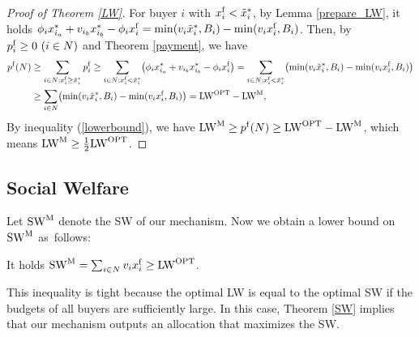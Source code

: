\documentclass[letterpaper,11pt]{article}
\begin{document}
\begin{proof}[Proof of Theorem \ref{LW}]
	For buyer $i$ with $x^{\rm f}_i< \tilde{x}^*_i$, by Lemma \ref{prepare_LW}, 
	it holds $\phi_{i}x_{i_{a}}^*+v_{i_{b}}x_{i_{b}}^*-\phi_{i}x^{\rm f}_{i}= \min(v_i \tilde{x}^{*}_i, B_i)-\min(v_i x^{\rm f}_i, B_i)$.
	Then, by $p^{\rm f}_i\geq 0\ (i\in N)$ and Theorem \ref{payment}, we have
	\begin{align*}
	p^{\rm f}(N) &\geq \sum_{i\in N; x^{\rm f}_i\geq \tilde{x}^*_i}p^{\rm f}_i\geq \sum_{i\in N; x^{\rm f}_i< \tilde{x}^*_i}\bigl(\phi_{i}x_{i_{a}}^*+v_{i_{b}}x_{i_{b}}^*-\phi_{i}x^{\rm f}_{i}\bigr)= \sum_{i\in N; x^{\rm f}_i< \tilde{x}^*_i}\bigl(\min(v_i \tilde{x}^{*}_i, B_i)-\min(v_i x^{\rm f}_i, B_i)\bigr)\\
	&\geq  \sum_{i\in N}\bigl(\min(v_i \tilde{x}^{*}_i, B_i)-\min(v_i x^{\rm f}_i, B_i)\bigr)={\rm LW}^{\rm OPT}-{\rm LW}^{\rm M}, 
	\end{align*}
	By inequality (\ref{lowerbound}), we have 
	${\rm LW}^{\rm M}\geq p^{\rm f}(N)\geq {\rm LW}^{\rm OPT}-{\rm LW}^{\rm M}$, 
	which means ${\rm LW}^{\rm M}\geq \frac{1}{2}{\rm LW}^{\rm OPT}$.
	
\end{proof}



\subsection{Social Welfare}
	Let ${\rm SW}^{\rm M}$ denote the SW of our mechanism.
	Now we obtain a lower bound on ${\rm SW}^{\rm M}$ as~follows:
	
	\begin{theorem}
	\label{SW}
	It holds ${\rm SW}^{\rm M}=\sum_{i\in N}v_i x^{\rm f}_i \geq {\rm LW}^{\rm OPT}$.
	\end{theorem}
	
	This inequality is tight because the optimal LW is equal to the optimal SW 
	if the budgets of all buyers are sufficiently large. 
	In this case, Theorem \ref{SW} implies that our mechanism outputs an allocation that maximizes the SW.
	
\end{document}

